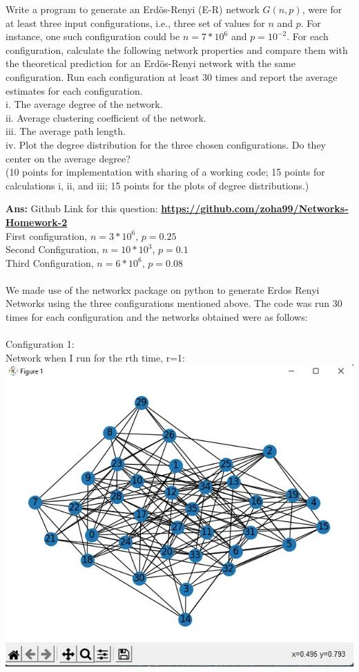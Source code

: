 \documentclass[answers]{exam}
\begin{document}
\begin{questions}
Write a program to generate an Erdös-Renyi (E-R) network $G(n, p)$, were for at least three input configurations, i.e., three set of values for $n$ and $p$. For instance, one such configuration could be $n=7 * 10^{6}$ and $p=10^{-2}$. For each configuration, calculate the following network properties and compare them with the theoretical prediction for an Erdös-Renyi network with the same configuration. Run each configuration at least 30 times and report the average estimates for each configuration.\\
i. The average degree of the network.\\
ii. Average clustering coefficient of the network.\\
iii. The average path length.\\
iv. Plot the degree distribution for the three chosen configurations. Do they center on the average degree?\\

(10 points for implementation with sharing of a working code; 15 points for calculations i, ii, and iii; 15 points for the plots of degree distributions.)

\begin{framed}

\textbf{Ans:} Github Link for this question:   \textbf{\url{https://github.com/zoha99/Networks-Homework-2}}\\
First configuration, $n=3*10^6$, $p=0.25$\\Second Configuration, $n=10*10^3$, $p=0.1$ \\Third Configuration, $n=6*10^6$, $p=0.08$\\\\We made use of the networkx package on python to generate Erdos Renyi Networks using the three configurations mentioned above. The code was run 30 times for each configuration and the networks obtained were as follows:
\\\\
Configuration 1:\\Network when I run for the rth time, r=1:\\
\includegraphics[width=10 cm]{first conf 1.jpg}\\


\end{framed}
\end{questions}
\end{document}
